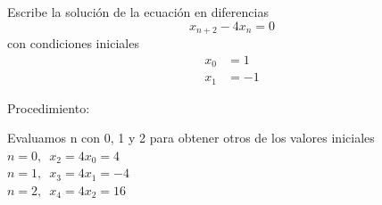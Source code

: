 \documentclass{article}
\begin{document}
Escribe la solución de la ecuación en diferencias
$$x_{n+2}-4x_n=0$$
con condiciones iniciales
\begin{align*}
  x_0&=1\\
  x_1&=-1
\end{align*}

\begin{center}
 Procedimiento:
\end{center}
Evaluamos n con 0, 1 y 2 para obtener otros de los valores iniciales\\
$n=0, $\ $x_2=4x_0=4$\\
$n=1, $\ $x_3=4x_1=-4$\\
$n=2, $\ $x_4=4x_2=16$
\end{document}
